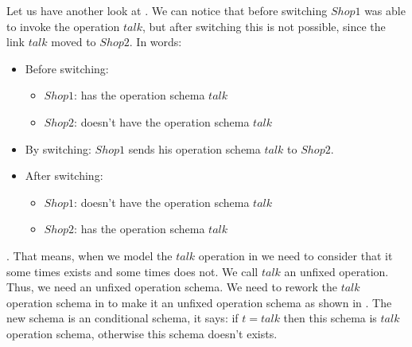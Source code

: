 Let us have another look at . We can notice that before switching $Shop1$ was able to invoke the operation $talk$, but after switching this is not possible, since the link $talk$ moved to $Shop2$. In \oz{} words:
\begin{itemize}
\item Before switching:
	\begin{itemize}
	\item $Shop1$: has the operation schema $talk$
	\item $Shop2$: doesn't have the operation schema $talk$
	\end{itemize}
\item By switching: $Shop1$ sends his operation schema $talk$ to $Shop2$.
\item After switching:
	\begin{itemize}
	\item $Shop1$: doesn't have the operation schema $talk$
	\item $Shop2$: has the operation schema $talk$
	\end{itemize}
\end{itemize}
. That means, when we model the $talk$ operation in \oz{} we need to consider that it some times exists and some times does not. We call $talk$ an unfixed operation. Thus, we need an unfixed operation schema. We need to rework the $talk$ operation schema in  to make it an unfixed operation schema as shown in . The new schema is an conditional schema, it says: if $t = talk$ then this schema is $talk$ operation schema, otherwise this schema doesn't exists.


